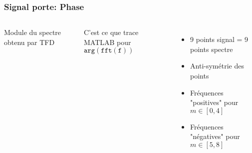 \documentclass{beamer}
\begin{document}
\begin{frame}
\frametitle{Signal porte: Phase}
\begin{columns}
\column{60mm}
Module du spectre obtenu par TFD
\begin{center}
\end{center}
C'est ce que trace MATLAB pour $\mathtt{arg(fft(f))}$

\column{60mm}

\begin{itemize}
\item 9 points signal =  9 points spectre
\item<3-> Anti-symétrie des points
\item<4-> Fréquences "positives" pour $m \in [0,4]$
\item<5-> Fréquences "négatives" pour $m \in [5,8]$
\end{itemize}
\end{columns}
\end{frame}
\end{document}
